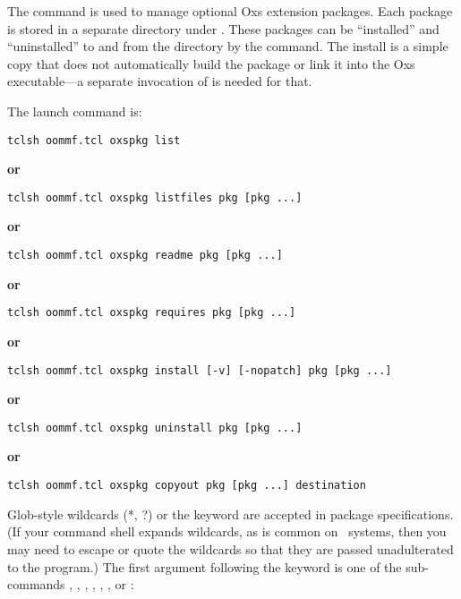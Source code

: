 The  command is used to manage optional Oxs extension
packages.  Each package is stored in a separate directory under
.  These packages can be ``installed'' and
``uninstalled'' to and from the  directory by
the  command.  The install is a simple copy that does not
automatically build the package or link it into the Oxs executable---a
separate invocation of
is needed for that.

The  launch command is:
\begin{duplex}
\item \verb+tclsh oommf.tcl oxspkg list+
\item[\textbf{or}]\html{\\}
\item \verb+tclsh oommf.tcl oxspkg listfiles pkg [pkg ...]+
\item[\textbf{or}]\html{\\}
\item \verb+tclsh oommf.tcl oxspkg readme pkg [pkg ...]+
\item[\textbf{or}]\html{\\}
\item \verb+tclsh oommf.tcl oxspkg requires pkg [pkg ...]+
\item[\textbf{or}]\html{\\}
\item \verb+tclsh oommf.tcl oxspkg install [-v] [-nopatch] pkg [pkg ...]+
\item[\textbf{or}]\html{\\}
\item \verb+tclsh oommf.tcl oxspkg uninstall pkg [pkg ...]+
\item[\textbf{or}]\html{\\}
\item \verb+tclsh oommf.tcl oxspkg copyout pkg [pkg ...] destination+
\end{duplex}
Glob-style wildcards (*, ?) or the keyword  are accepted in
package specifications.  (If your command shell expands wildcards, as
is common on \Unix\ systems, then you may need to escape or quote the
wildcards so that they are passed unadulterated to the 
program.)  The first argument following the 
keyword is one of the sub-commands , ,
, , , , or
:
